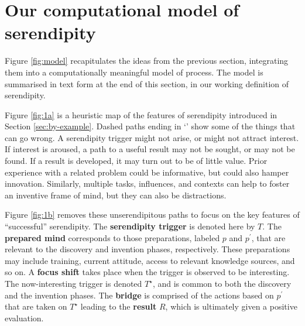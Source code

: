 \section{Our computational model of serendipity} \label{sec:our-model}

Figure \ref{fig:model} recapitulates the ideas from the previous
section, integrating them into a computationally meaningful model of
process.  The model is summarised in text form at the end of this
section, in our working definition of serendipity.

Figure \ref{fig:1a} is a heuristic map of the features of serendipity
introduced in Section \ref{sec:by-example}.
%
Dashed paths ending in `\ymark' show some of the things that can go
wrong.  A serendipity trigger might not arise, or might not attract
interest.  If interest is aroused, a path to a useful result may not
be sought, or may not be found.  If a result is
developed, it may turn out to be of little value.  Prior experience
with a related problem could be informative, but could also hamper
innovation.  Similarly, multiple tasks, influences, and
contexts can help to foster an inventive frame of mind, but they can
also be distractions.

Figure \ref{fig:1b} removes these unserendipitous paths to focus on
the key features of ``successful'' serendipity.
%
The \textbf{serendipity trigger} is denoted here by $T$.  
%
The \textbf{prepared mind} corresponds to those preparations, labeled
$p$ and $p^{\prime}$, that are relevant to the discovery and invention
phases, respectively.  These preparations may include training,
current attitude, access to relevant knowledge sources, and so on.
%
A \textbf{focus shift} takes place when the trigger is observed to be
interesting.  The now-interesting trigger is denoted $T^\star$, and is
common to both the discovery and the invention phases.
%
%
The \textbf{bridge} is comprised of the actions based on $p^{\prime}$
that are taken on $T^\star$ leading to the \textbf{result} $R$, which is ultimately given a positive evaluation.

